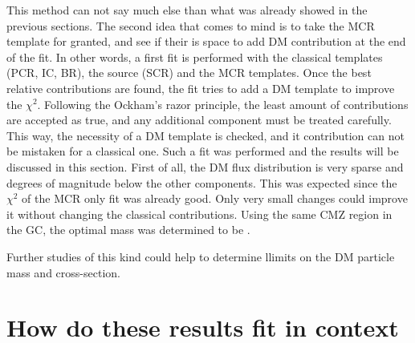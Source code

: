 This method can not say much else than what was already showed in the previous sections. The second idea that comes to mind is to take the MCR template for granted, and see if their is space to add DM contribution at the end of the fit. In other words, a first fit is performed with the classical templates (PCR, IC, BR), the source (SCR) and the MCR templates. Once the best relative contributions are found, the fit tries to add a DM template to improve the $\chi^2$.
Following the Ockham's razor principle, the least amount of contributions are accepted as true, and any additional component must be treated carefully. This way, the necessity of a DM template is checked, and it contribution can not be mistaken for a classical one.
Such a fit was performed and the results will be discussed in this section. First of all, the DM flux distribution  is very sparse and degrees of magnitude below the other components. This was expected since the $\chi^2$ of the MCR only fit was already good. Only very small changes could improve it without changing the classical contributions. Using the same CMZ region in the GC, the optimal mass was determined to be .

Further studies of this kind could help to determine llimits on the DM particle mass and cross-section.


\section{How do these results fit in context}
%		



